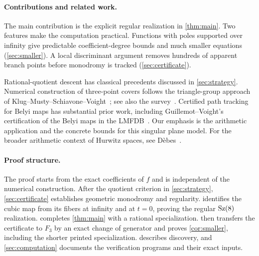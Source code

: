 \paragraph{Contributions and related work.}
The main contribution is the explicit regular realization in
\cref{thm:main}. Two features make the computation practical.
Functions with poles supported over infinity give predictable
coefficient-degree bounds and much smaller equations (\cref{sec:smaller}).
A local discriminant argument removes hundreds of apparent branch points
before monodromy is tracked (\cref{sec:certificate}).

Rational-quotient descent has classical precedents discussed in
\cref{sec:strategy}. Numerical construction of three-point covers follows
the triangle-group approach of Klug--Musty--Schiavone--Voight~\cite{KMSV2014};
see also the survey~\cite{SijslingVoight2014}. Certified path tracking for
Belyi maps has substantial prior work, including Guillemot--Voight's
certification of the Belyi maps in the LMFDB~\cite{GuillemotVoight2026}.
Our emphasis is the arithmetic application and the concrete bounds for
this singular plane model. For the broader arithmetic context of Hurwitz
spaces, see D\`ebes~\cite{Debes2026}.

\paragraph{Proof structure.}
The proof starts from the exact coefficients of $f$ and is independent
of the numerical construction. After the quotient criterion in
\cref{sec:strategy}, \cref{sec:certificate} establishes geometric
monodromy and regularity.  identifies the cubic map
from its fibers at infinity and at $t=0$, proving the regular
$\operatorname{Sz}(8)$ realization.  completes
\cref{thm:main} with a rational specialization. 
then transfers the certificate to $F_3$ by an exact change of generator
and proves \cref{cor:smaller}, including the shorter printed
specialization.  describes discovery,
and \cref{sec:computation} documents the verification programs and their
exact inputs.
